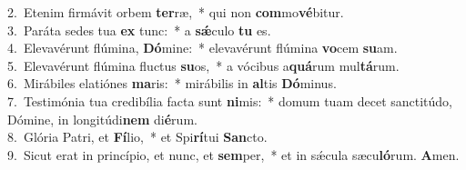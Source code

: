 {2.~}Etenim firmávit orbem \textbf{ter}ræ,~* qui non \textbf{com}mo\textbf{vé}bitur.\\
{3.~}Paráta sedes tua \textbf{ex} tunc:~* a \textbf{sǽ}culo \textbf{tu} es.\\
{4.~}Elevavérunt flúmina, \textbf{Dó}mine:~* elevavérunt flúmina \textbf{vo}cem \textbf{su}am.\\
{5.~}Elevavérunt flúmina fluctus \textbf{su}os,~* a vócibus a\textbf{quá}rum mul\textbf{tá}rum.\\
{6.~}Mirábiles elatiónes \textbf{ma}ris:~* mirábilis in \textbf{al}tis \textbf{Dó}minus.\\
{7.~}Testimónia tua credibília facta sunt \textbf{ni}mis:~* domum tuam decet sanctitúdo, Dómine, in longitúdi\textbf{nem} di\textbf{é}rum.\\
{8.~}Glória Patri, et \textbf{Fí}lio,~* et Spi\textbf{rí}tui \textbf{San}cto.\\
{9.~}Sicut erat in princípio, et nunc, et \textbf{sem}per,~* et in sǽcula sæcu\textbf{ló}rum. \textbf{A}men.\\
